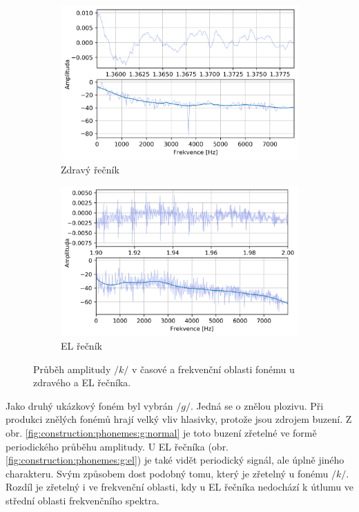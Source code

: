 \begin{figure}[htpb]
  \centering
  \begin{subfigure}[b]{0.45\textwidth}
    \includegraphics[width=\textwidth]{./ch5-construction/img/signal-normal_k.png}
    \caption{Zdravý řečník}
    \label{fig:construction:phonemes:k:normal}
  \end{subfigure}
  \begin{subfigure}[b]{0.45\textwidth}
    \includegraphics[width=\textwidth]{./ch5-construction/img/signal-el_k.png}
    \caption{EL řečník}
    \label{fig:construction:phonemes:k:el}
  \end{subfigure}
  \caption[Průběh amplitudy fonému $/k/$ zdravého a EL řečníka.]{Průběh amplitudy $/k/$ v časové a frekvenční oblasti fonému u zdravého a EL řečníka.}
  \label{fig:construction:phonemes:k}
\end{figure}

Jako druhý ukázkový foném byl vybrán $/g/$.
Jedná se o znělou plozivu.
Při produkci znělých fonémů hrají velký vliv hlasivky, protože jsou zdrojem buzení.
Z obr. \ref{fig:construction:phonemes:g:normal} je toto buzení zřetelné ve formě periodického průběhu amplitudy.
U EL řečníka (obr. \ref{fig:construction:phonemes:g:el}) je také vidět periodický signál, ale úplně jiného charakteru.
Svým způsobem dost podobný tomu, který je zřetelný u fonému $/k/$.
Rozdíl je zřetelný i ve frekvenční oblasti, kdy u EL řečníka nedochází k útlumu ve střední oblasti frekvenčního spektra.

